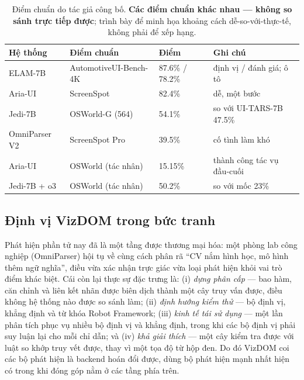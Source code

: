 \documentclass[11pt,a4paper]{article}
\begin{document}
\begin{table}[H]
  \centering\footnotesize
  \caption{Điểm chuẩn do tác giả công bố. \textbf{Các điểm chuẩn khác nhau --- không
  so sánh trực tiếp được}; trình bày để minh họa khoảng cách dễ-so-với-thực-tế, không
  phải để xếp hạng.}
  \label{tab:bench}
  \begin{tabular}{@{}p{3.0cm}p{4.4cm}p{3.0cm}p{3.2cm}@{}}
    \toprule
    Hệ thống & Điểm chuẩn & Điểm & Ghi chú \\
    \midrule
    ELAM-7B & AutomotiveUI-Bench-4K & 87.6\% / 78.2\% & định vị / đánh giá; ô tô \\
    Aria-UI & ScreenSpot & 82.4\% & dễ, một bước \\
    Jedi-7B & OSWorld-G (564) & 54.1\% & so với UI-TARS-7B 47.5\% \\
    OmniParser V2 & ScreenSpot Pro & 39.5\% & cố tình làm khó \\
    Aria-UI & OSWorld (tác nhân) & 15.15\% & thành công tác vụ đầu-cuối \\
    Jedi-7B + o3 & OSWorld (tác nhân) & 50.2\% & so với mốc 23\% \\
    \bottomrule
  \end{tabular}
\end{table}

\subsection{Định vị VizDOM trong bức tranh}
Phát hiện phần tử nay đã là một tầng được thương mại hóa: một phòng lab công nghiệp
(OmniParser) hội tụ về cùng cách phân rã ``CV nắm hình học, mô hình thêm ngữ nghĩa'',
điều vừa xác nhận trực giác vừa loại phát hiện khỏi vai trò điểm khác biệt. Cái còn
lại thực sự đặc trưng là: (i) \emph{dựng phân cấp} --- bao hàm, căn chỉnh và liên kết
nhãn được biên dịch thành một cây truy vấn được, điều không hệ thống nào được so sánh
làm; (ii) \emph{định hướng kiểm thử} --- bộ định vị, khẳng định và từ khóa Robot
Framework; (iii) \emph{kinh tế tái sử dụng} --- một lần phân tích phục vụ nhiều bộ
định vị và khẳng định, trong khi các bộ định vị phải suy luận lại cho mỗi chỉ dẫn; và
(iv) \emph{khả giải thích} --- một cây kiểm tra được với luật so khớp truy vết được,
thay vì một tọa độ từ hộp đen. Do đó VizDOM coi các bộ phát hiện là backend hoán đổi
được, dùng bộ phát hiện mạnh nhất hiện có trong khi đóng góp nằm ở các tầng phía trên.
\end{document}
